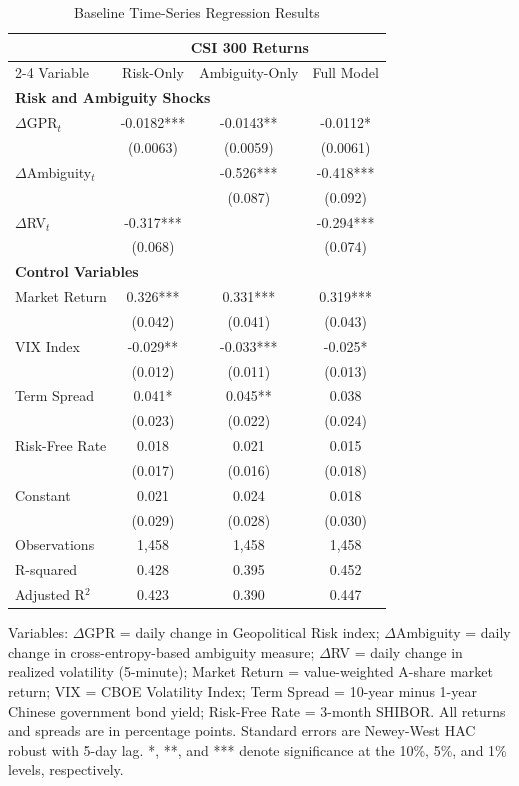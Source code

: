 \documentclass[preprint,12pt,authoryear]{elsarticle}
\begin{document}
\begin{table}[htbp]
\centering
\caption{Baseline Time-Series Regression Results}
\label{tab:baseline_ts}
\begin{threeparttable}
\begin{tabular*}{\textwidth}{@{\extracolsep{\fill}} lccc @{\extracolsep{\fill}}}
\toprule
& \multicolumn{3}{c}{CSI 300 Returns} \\
\cmidrule(lr){2-4}
Variable & Risk-Only & Ambiguity-Only & Full Model \\
\midrule
\midrule
\multicolumn{4}{l}{\textbf{Risk and Ambiguity Shocks}} \\
$\Delta$GPR$_t$ & -0.0182*** & -0.0143** & -0.0112* \\
& (0.0063) & (0.0059) & (0.0061) \\
$\Delta$Ambiguity$_t$ &  & -0.526*** & -0.418*** \\
&  & (0.087) & (0.092) \\
$\Delta$RV$_t$ & -0.317*** &  & -0.294*** \\
& (0.068) &   & (0.074) \\
\midrule
\multicolumn{4}{l}{\textbf{Control Variables}} \\
Market Return & 0.326*** & 0.331*** & 0.319*** \\
& (0.042) & (0.041) & (0.043) \\
VIX Index & -0.029** & -0.033*** & -0.025* \\
& (0.012) & (0.011) & (0.013) \\
Term Spread & 0.041* & 0.045** & 0.038 \\
& (0.023) & (0.022) & (0.024) \\
Risk-Free Rate & 0.018 & 0.021 & 0.015 \\
& (0.017) & (0.016) & (0.018) \\
\midrule
Constant & 0.021 & 0.024 & 0.018 \\
& (0.029) & (0.028) & (0.030) \\
\midrule
Observations & 1,458 & 1,458 & 1,458 \\
R-squared & 0.428 & 0.395 & 0.452 \\
Adjusted R$^2$ & 0.423 & 0.390 & 0.447 \\
\bottomrule
\end{tabular*}
\begin{tablenotes}[flushleft]
\small
\item[] Variables: $\Delta$GPR = daily change in Geopolitical Risk index; $\Delta$Ambiguity = daily change in cross-entropy-based ambiguity measure; $\Delta$RV = daily change in realized volatility (5-minute); Market Return = value-weighted A-share market return; VIX = CBOE Volatility Index; Term Spread = 10-year minus 1-year Chinese government bond yield; Risk-Free Rate = 3-month SHIBOR. All returns and spreads are in percentage points. Standard errors are Newey-West HAC robust with 5-day lag. *, **, and *** denote significance at the 10\%, 5\%, and 1\% levels, respectively.
\end{tablenotes}
\end{threeparttable}
\end{table}
\end{document}
